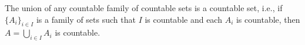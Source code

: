 The union of any countable family of countable sets is a countable set, i.e., if $\{A_i\}_{i \in I}$ is a family of sets such that $I$ is countable and each $A_i$ is countable, then $A = \bigcup_{i \in I} A_i$ is countable.